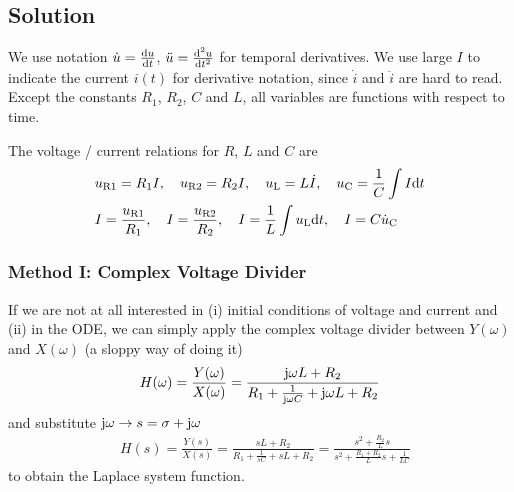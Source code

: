 \documentclass[11pt,a4paper,DIV=12]{scrartcl}
\newcommand\uc{u_\mathrm{C}}
\newcommand\duc{\dot{u}_\mathrm{C}}
\newcommand\ul{u_\mathrm{L}}
\newcommand\uri{u_\mathrm{R1}}
\newcommand\urii{u_\mathrm{R2}}
\renewcommand\c{I}
\newcommand\dc{\dot{I}}
\begin{document}
\subsection{Solution}
%
We use notation $\dot{u} = \frac{\mathrm{d} u}{\mathrm{d} t}$, $\ddot{u} = \frac{\mathrm{d}^2 u}{\mathrm{d} t^2}$
for temporal derivatives. We use large $I$ to indicate the current $i(t)$ for
derivative notation, since $\dot{i}$ and $\ddot{i}$ are hard to read.
%
Except the constants $R_1$, $R_2$, $C$ and $L$, all variables are functions
with respect to time.

The voltage / current relations for $R$, $L$ and $C$ are
\begin{align*}
&\uri = R_1 \c, \quad \urii = R_2 \c, \quad \ul = L \dc, \quad \uc = \frac{1}{C}\int \c \fsd t\\
&\c = \frac{\uri}{R_1}, \quad \c = \frac{\urii}{R_2}, \quad \c = \frac{1}{L} \int \ul \fsd t, \quad \c = C \duc
\end{align*}

\subsubsection{Method I: Complex Voltage Divider}
%
If we are not at all interested in (i) initial conditions of voltage and
current and (ii) in the ODE, we can simply apply the complex voltage
divider between $Y(\omega)$ and $X(\omega)$ (a sloppy way of doing it)
%
\begin{align}
H(\omega) = \frac{Y(\omega)}{X(\omega)} =
\frac{\im \omega L + R_2}{R_1 + \frac{1}{\im \omega C} + \im \omega L + R_2}
\end{align}
%
and substitute $\im \omega \rightarrow s = \sigma + \im\omega$
%
\begin{align}
&H(s) = \frac{Y(s)}{X(s)} = \frac{s L + R_2}{R_1 + \frac{1}{s C} + s L + R_2}=
\frac{s^2 + \frac{R_2}{L} s}{s^2 + \frac{R_1 + R_2}{L} s + \frac{1}{L C}}
\end{align}
%
to obtain the Laplace system function.
%
\end{document}
